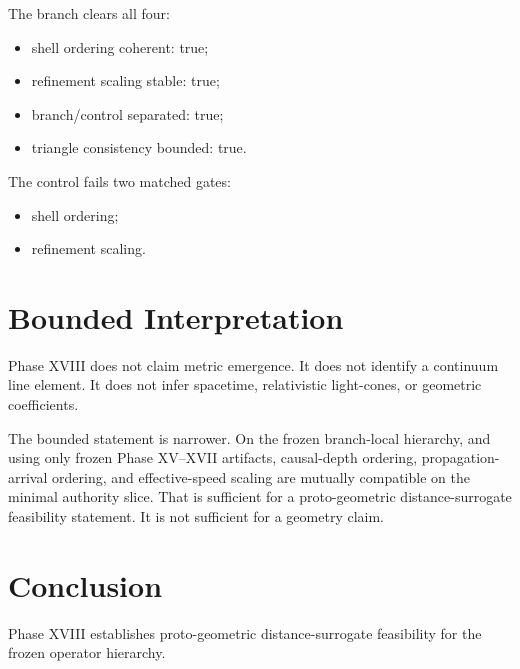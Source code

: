 \documentclass[11pt]{article}
\begin{document}
The branch clears all four:
\begin{itemize}
\item shell ordering coherent: true;
\item refinement scaling stable: true;
\item branch/control separated: true;
\item triangle consistency bounded: true.
\end{itemize}

The control fails two matched gates:
\begin{itemize}
\item shell ordering;
\item refinement scaling.
\end{itemize}

\section{Bounded Interpretation}

Phase XVIII does not claim metric emergence. It does not identify a continuum line element. It does not infer spacetime, relativistic light-cones, or geometric coefficients.

The bounded statement is narrower. On the frozen branch-local hierarchy, and using only frozen Phase XV--XVII artifacts, causal-depth ordering, propagation-arrival ordering, and effective-speed scaling are mutually compatible on the minimal authority slice. That is sufficient for a proto-geometric distance-surrogate feasibility statement. It is not sufficient for a geometry claim.

\section{Conclusion}

Phase XVIII establishes proto-geometric distance-surrogate feasibility for the frozen operator hierarchy.
\end{document}
